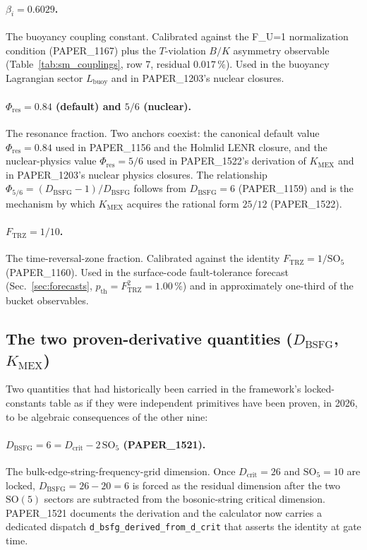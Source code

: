 \paragraph{$\beta_i = 0.6029$.}
The buoyancy coupling constant. Calibrated against the F\_U=1
normalization condition (PAPER\_1167) plus the $T$-violation $B/K$
asymmetry observable (Table~\ref{tab:sm_couplings}, row 7, residual
$0.017\,\%$). Used in the buoyancy Lagrangian sector $L_{\text{buoy}}$
and in PAPER\_1203's nuclear closures.

\paragraph{$\Phi_{\text{res}} = 0.84$ (default) and $5/6$ (nuclear).}
The resonance fraction. Two anchors coexist: the canonical default
value $\Phi_{\text{res}} = 0.84$ used in PAPER\_1156 and the
Holmlid LENR closure, and the nuclear-physics value
$\Phi_{\text{res}} = 5/6$ used in PAPER\_1522's derivation of
$K_{\text{MEX}}$ and in PAPER\_1203's nuclear physics closures.
The relationship $\Phi_{5/6} = (D_{\text{BSFG}}-1)/D_{\text{BSFG}}$
follows from $D_{\text{BSFG}} = 6$ (PAPER\_1159) and is the
mechanism by which $K_{\text{MEX}}$ acquires the rational form
$25/12$ (PAPER\_1522).

\paragraph{$F_{\text{TRZ}} = 1/10$.}
The time-reversal-zone fraction. Calibrated against the identity
$F_{\text{TRZ}} = 1/\mathrm{SO}_5$ (PAPER\_1160). Used in the
surface-code fault-tolerance forecast
(Sec.~\ref{sec:forecasts}, $p_{\text{th}} = F_{\text{TRZ}}^2 = 1.00\,\%$)
and in approximately one-third of the bucket observables.

\subsection{The two proven-derivative quantities ($D_{\text{BSFG}}$, $K_{\text{MEX}}$)}
\label{sec:derivative_primitives}

Two quantities that had historically been carried in the framework's
locked-constants table as if they were independent primitives have
been proven, in 2026, to be algebraic consequences of the other
nine:

\paragraph{$D_{\text{BSFG}} = 6 = D_{\text{crit}} - 2\,\mathrm{SO}_5$
(PAPER\_1521).}
The bulk-edge-string-frequency-grid dimension. Once $D_{\text{crit}}=26$
and $\mathrm{SO}_5=10$ are locked, $D_{\text{BSFG}} = 26 - 20 = 6$
is forced as the residual dimension after the two $\mathrm{SO}(5)$
sectors are subtracted from the bosonic-string critical dimension.
PAPER\_1521 documents the derivation and the calculator now carries
a dedicated dispatch \texttt{d\_bsfg\_derived\_from\_d\_crit} that
asserts the identity at gate time.

